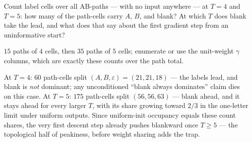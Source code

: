 \begin{problem}[stretch]
Count label cells over all AB-paths — with no input anywhere — at
$T = 4$ and $T = 5$: how many of the path-cells carry $A$, $B$, and
blank? At which $T$ does blank take the lead, and what does that say
about the first gradient step from an uninformative start?
\begin{hint}
$15$ paths of $4$ cells, then $35$ paths of $5$ cells; enumerate or
use the unit-weight $\gamma$ columns, which are exactly these counts
over the path total.
\end{hint}
\begin{solution}
At $T = 4$: $60$ path-cells split $(A, B, \varepsilon) =
(21, 21, 18)$ — the labels lead, and blank is \emph{not} dominant;
any unconditioned ``blank always dominates'' claim dies on this
case. At $T = 5$: $175$ path-cells split $(56, 56, 63)$ — blank
ahead, and it stays ahead for every larger $T$, with its share
growing toward $2/3$ in the one-letter limit under uniform outputs.
Since uniform-init occupancy equals these count shares, the very
first descent step already pushes blankward once $T \geq 5$ — the
topological half of peakiness, before weight sharing adds the trap.
\end{solution}
\end{problem}
